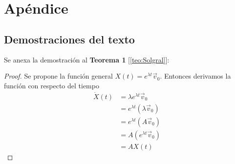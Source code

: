 \chapter{Apéndice}\label{ch:Ap}

\section{Demostraciones del texto}

Se anexa la demostración al \textbf{Teorema 1} [\ref{teo:Solgral}]:
\begin{proof}
	Se propone la función general $X(t)=e^{\lambda t}\vec{v}_0$. Entonces derivamos la función con respecto del tiempo
	\begin{align*}
		\dot{X}(t) &= \lambda e^{\lambda t}\vec{v}_0\\
				   &= e^{\lambda t}(\lambda\vec{v}_0)\\
				   &= e^{\lambda t}(A\vec{v}_0)		\\
				   &= A(e^{\lambda t}\vec{v}_0)\\
				   &= AX(t)
	\end{align*}
\end{proof}
